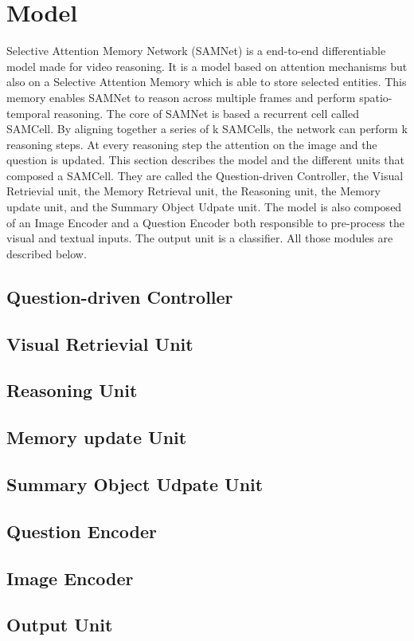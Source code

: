 \section{Model}


Selective Attention Memory Network (SAMNet) is a end-to-end differentiable model made for video reasoning. It is a model based on attention mechanisms but also on a Selective Attention Memory which is able to store selected entities. This memory enables SAMNet to reason across multiple frames and perform spatio-temporal reasoning. 
The core of SAMNet is based a recurrent cell called SAMCell. By aligning together a series of k SAMCells, the network can perform k reasoning steps. At every reasoning step the attention on the image and the question is updated. This section describes the model and the different units that composed a SAMCell. They are called the Question-driven Controller, the Visual Retrievial unit, the Memory Retrieval unit, the Reasoning unit, the Memory update unit, and the Summary Object Udpate unit. 
The model is also composed of an Image Encoder and a Question Encoder both responsible to pre-process the visual and textual inputs. The output unit is a classifier.
All those modules are described below.

\subsection{Question-driven Controller}
\subsection{Visual Retrievial Unit}
\subsection{Reasoning Unit}
\subsection{Memory update Unit}
\subsection{Summary Object Udpate Unit}
\subsection{Question Encoder}
\subsection{Image Encoder}
\subsection{Output Unit}
